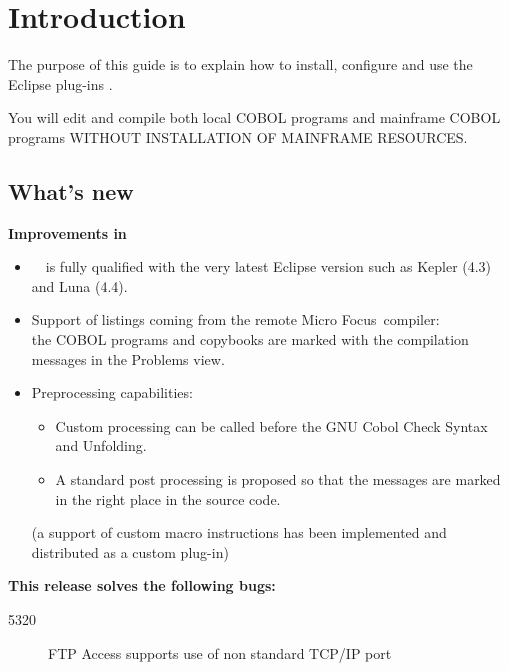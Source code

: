 \chapter{Introduction}

The purpose of this guide is to explain how to install, configure and use the Eclipse plug-ins \mxproduct.

You will edit and compile both local COBOL programs and mainframe COBOL programs WITHOUT INSTALLATION OF MAINFRAME RESOURCES.

\section{What's new}

\textbf{Improvements in \mxproduct~\mxversion{:}}

\begin{itemize}
\item \mxproduct~\mxversion~is fully qualified with the very latest Eclipse version such as Kepler (4.3) and Luna (4.4).

\item Support of listings coming from the remote Micro Focus\textregistered~compiler:\\
the COBOL programs and copybooks are marked with the compilation messages in the Problems view.

\item Preprocessing capabilities:
\begin{itemize}
\item Custom processing can be called before the GNU Cobol Check Syntax and Unfolding.

\item A standard post processing is proposed so that the messages are marked in the right place in the source code.
\end{itemize}

(a support of custom macro instructions has been implemented and distributed as a custom plug-in)
\end{itemize}

\vspace{0.5cm}
\textbf{This release solves the following bugs:}


\begin{description}
\item[5320] FTP Access supports use of non standard TCP/IP port

\end{description}
\newpage

